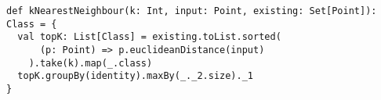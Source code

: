 
\begin{lstlisting}[label=nearestNeighbour, caption=Scala Nearest Neighbour]
def kNearestNeighbour(k: Int, input: Point, existing: Set[Point]): Class = {
  val topK: List[Class] = existing.toList.sorted(
      (p: Point) => p.euclideanDistance(input)
    ).take(k).map(_.class)
  topK.groupBy(identity).maxBy(_._2.size)._1
}
\end{lstlisting}

